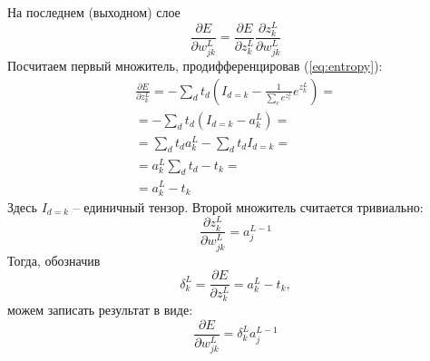 \documentclass[a4paper,12pt]{article}
\theoremstyle{remark}
\begin{document}
	На последнем (выходном) слое
	\begin{equation}
		\frac{\partial E}{\partial w_{jk}^L} = \frac{\partial E}{\partial z_k^L} \frac{\partial z_k^L}{\partial w_{jk}^L}
	\end{equation}
	Посчитаем первый множитель, продифференцировав (\ref{eq:entropy}):
	\begin{equation}
		\begin{gathered}
			\frac{\partial E}{\partial z_k^L} = - \sum_d t_d (I_{d = k} - \frac{1}{\sum_c e^{z_c^L}} e^{z_k^L}) = \\
			= - \sum_d t_d (I_{d = k} - a_k^L) = \\
			= \sum_d t_d a_k^L - \sum_d t_d I_{d = k} = \\
			= a_k^L \sum_d t_d - t_k = \\
			= a_k^L - t_k
		\end{gathered}
	\end{equation}
	Здесь $I_{d = k}$ -- единичный тензор. Второй множитель считается тривиально:
	\begin{equation}
		\frac{\partial z_k^L}{\partial w_{jk}^L} = a_j^{L-1}
	\end{equation}
	Тогда, обозначив
	\begin{equation}
		\delta_k^L = \frac{\partial E}{\partial z_k^L} = a_k^L - t_k,
	\end{equation}
	можем записать результат в виде:
	\begin{equation}\label{eq:derivative_output}
		\frac{\partial E}{\partial w_{jk}^L} = \delta_k^L a_j^{L-1}
	\end{equation}
	
\end{document}
